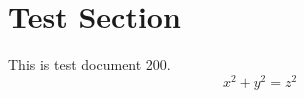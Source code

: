 \documentclass{article}
\begin{document}
\section{Test Section}
This is test document 200.
\begin{equation}
x^2 + y^2 = z^2
\end{equation}
\end{document}
